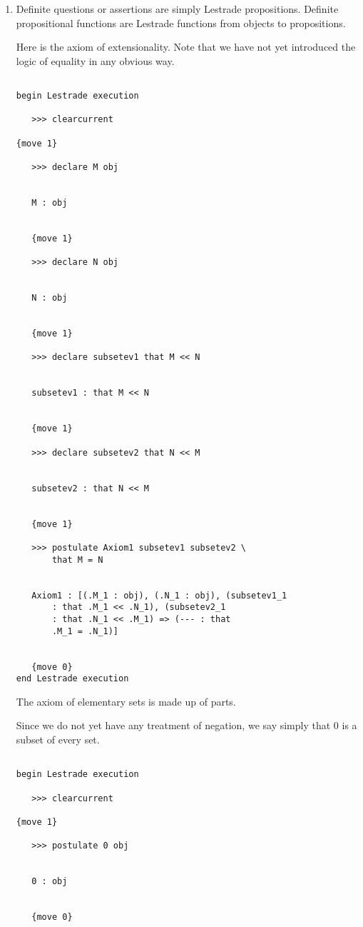 \documentclass[12pt]{article}
\begin{document}
\begin{enumerate}

\item  Definite questions or assertions are simply Lestrade propositions.  Definite propositional functions are Lestrade functions from objects to propositions.

Here is the axiom of extensionality.  Note that we have not yet introduced the logic of equality in any obvious way.

\begin{verbatim}

begin Lestrade execution

   >>> clearcurrent

{move 1}

   >>> declare M obj


   M : obj


   {move 1}

   >>> declare N obj


   N : obj


   {move 1}

   >>> declare subsetev1 that M << N


   subsetev1 : that M << N


   {move 1}

   >>> declare subsetev2 that N << M


   subsetev2 : that N << M


   {move 1}

   >>> postulate Axiom1 subsetev1 subsetev2 \
       that M = N


   Axiom1 : [(.M_1 : obj), (.N_1 : obj), (subsetev1_1 
       : that .M_1 << .N_1), (subsetev2_1 
       : that .N_1 << .M_1) => (--- : that 
       .M_1 = .N_1)]


   {move 0}
end Lestrade execution

\end{verbatim}

The axiom of elementary sets is made up of parts.

Since we do not yet have any treatment of negation, we say simply that 0 is a subset of every set.

\begin{verbatim}

begin Lestrade execution

   >>> clearcurrent

{move 1}

   >>> postulate 0 obj


   0 : obj


   {move 0}


\end{verbatim}
\end{enumerate}
\end{document}
